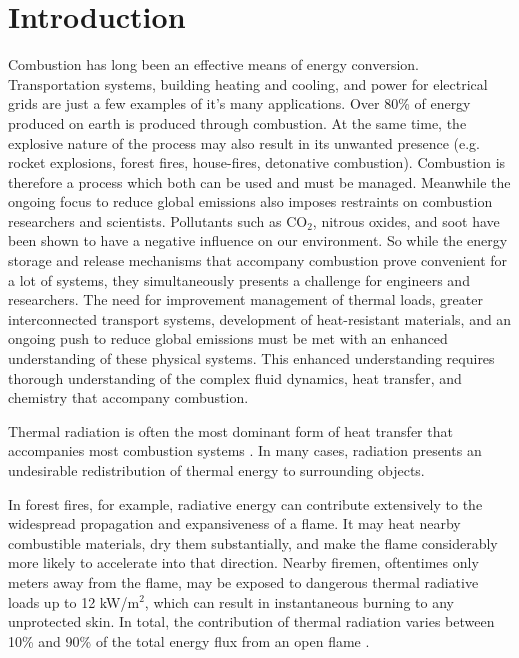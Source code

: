 \addchapheadtotoc

\chapter{Introduction} \label{chapter:Introduction}
Combustion has long been an effective means of energy conversion. Transportation systems, building heating and cooling, and power for electrical grids are just a few examples of it's many applications. Over 80\% of energy produced on earth is produced through combustion. 
At the same time, the explosive nature of the process may also result in its unwanted presence (e.g. rocket explosions, forest fires, house-fires, detonative combustion).
Combustion is therefore a process which both can be used and must be managed. 
Meanwhile the ongoing focus to reduce global emissions also imposes restraints on combustion researchers and scientists. Pollutants such as CO${}_2$, nitrous oxides, and soot have been shown to have a negative influence on our environment.
So while the energy storage and release mechanisms that accompany combustion prove convenient for a lot of systems, they simultaneously presents a challenge for engineers and researchers.
The need for improvement management of thermal loads, greater interconnected transport systems, development of heat-resistant materials, and an ongoing push to reduce global emissions must be met with an enhanced understanding of these physical systems.
This enhanced understanding requires thorough understanding of the complex fluid dynamics, heat transfer, and chemistry that accompany combustion.

Thermal radiation is often the most dominant form of heat transfer that accompanies most combustion systems \cite{Coelho2018RadiativeSystems}. In many cases, radiation presents an undesirable redistribution of thermal energy to surrounding objects.

In forest fires, for example, radiative energy can contribute extensively to the widespread propagation and expansiveness of a flame. 
It may heat nearby combustible materials, dry them substantially, and make the flame considerably more likely to accelerate into that direction. 
Nearby firemen, oftentimes only meters away from the flame, may be exposed to dangerous thermal radiative loads up to 12 kW/m$^2$, which can result in instantaneous burning to any unprotected skin.
In total, the contribution of thermal radiation varies between 10\% and 90\% of the total energy flux from an open flame \cite{Valendik:2008vo}.



